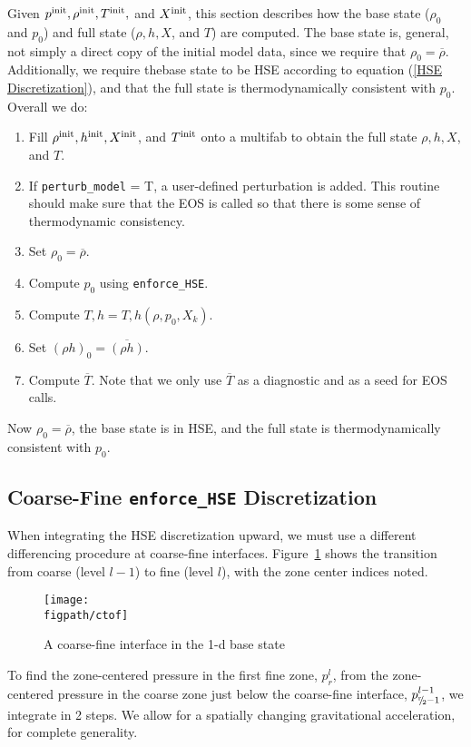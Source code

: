 Given $p^{\rm init}, \rho^{\rm init}, T^{\rm init},$ and $X^{\rm init}$, this
section describes how the base state ($\rho_0$ and $p_0$) and full
state ($\rho, h, X$, and $T$) are computed.  The base state is, general, not
simply a direct copy of the initial model data, since we require that
$\rho_0 = \overline\rho$.  Additionally, we require thebase state to
be HSE according to equation (\ref{HSE Discretization}), and that the full
state is thermodynamically consistent with $p_0$.  Overall we do:
\begin{enumerate}
\item Fill $\rho^{\rm init}, h^{\rm init}, X^{\rm init}$, and $T^{\rm init}$ onto a 
  multifab to obtain the full state $\rho, h, X$, and $T$.
\item If {\tt perturb\_model} = T, a user-defined perturbation is
  added.  This routine should make sure that the EOS is called so that
  there is some sense of thermodynamic consistency.
\item Set $\rho_0 = \overline\rho$.
\item Compute $p_0$ using {\tt enforce\_HSE}.
\item Compute $T,h = T,h(\rho,p_0,X_k)$.
\item Set $(\rho h)_0 = \overline{(\rho h)}$.
\item Compute $\overline{T}$.  Note that we only use $\overline{T}$ as
  a diagnostic and as a seed for EOS calls.
\end{enumerate}
Now $\rho_0 = \overline\rho$, the base state is in HSE, and the full
state is thermodynamically consistent with $p_0$.

\subsection{Coarse-Fine {\tt enforce\_HSE} Discretization}\label{Sec:Coarse-Fine HSE Discretization}
When integrating the HSE discretization upward, we must use a different
differencing procedure at coarse-fine interfaces.  Figure~\ref{fig:ctof} shows
the transition from coarse (level $l-1$) to fine (level $l$), with the zone
center indices noted.  
\begin{figure}[t]
\centering
\texttt{[image: \\figpath/ctof]}
\caption{\label{fig:ctof} A coarse-fine interface in the 1-d base state}
\end{figure}

To find the zone-centered pressure in the first fine zone, $p_r^l$, from
the zone-centered pressure in the coarse zone just below the coarse-fine interface,
$p_{\sfrac{r}{2}-1}^{l-1}$, we integrate in 2 steps.  We allow for a spatially
changing gravitational acceleration, for complete generality.

